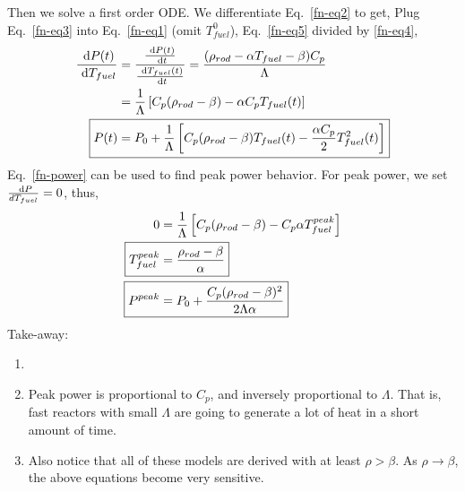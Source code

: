 \documentclass{school-22.211-notes}
\begin{document}
Then we solve a first order ODE. We differentiate Eq.~\ref{fn-eq2} to get,
Plug Eq.~\ref{fn-eq3} into Eq.~\ref{fn-eq1} (omit $T_{fuel}^0$), 
Eq.~\ref{fn-eq5} divided by \ref{fn-eq4}, 
\begin{align}
\frac{\dP(t)}{\dT_{fuel}} &= \frac{\frac{\dP(t)}{\dt}}{\frac{\dT_{fuel} (t)}{\dt}} =  \frac{(\rho_{rod} - \alpha T_{fuel} - \beta ) C_p}{\Lambda} \\
&= \frac{1}{\Lambda} \left[ C_p (\rho_{rod} - \beta) - \alpha C_p T_{fuel} (t) \right] \\
\Aboxed{ P(t) &= P_0 + \frac{1}{\Lambda} \left[ C_p (\rho_{rod} - \beta) T_{fuel} (t)  - \frac{\alpha C_p}{2} T^2_{fuel} (t) \right]  } \label{fn-power}
\end{align}
Eq.~\ref{fn-power} can be used to find peak power behavior. For peak power, we set $\frac{\mbox{ }\mathrm{d} P}{dT_{fuel}} = 0$, thus, 
\begin{align}
0 &= \frac{1}{\Lambda} \left[ C_p (\rho_{rod} - \beta) - C_p \alpha T_{fuel}^{peak} \right] \\
\Aboxed{ T_{fuel}^{peak} &= \frac{\rho_{rod} - \beta}{\alpha} } \label{fn-11} \\
\Aboxed{ P^{peak} &= P_0 + \frac{C_p (\rho_{rod} - \beta)^2}{2 \Lambda \alpha} }
\end{align}
Take-away: 
\begin{enumerate}
\item {} 
\item Peak power is proportional to $C_p$, and inversely proportional to $\Lambda$. That is, fast reactors with small $\Lambda$ are going to generate a lot of heat in a short amount of time. 
\item Also notice that all of these models are derived with at least $\rho > \beta$. As $\rho \to \beta$, the above equations become very sensitive.
\end{enumerate}
\end{document}
